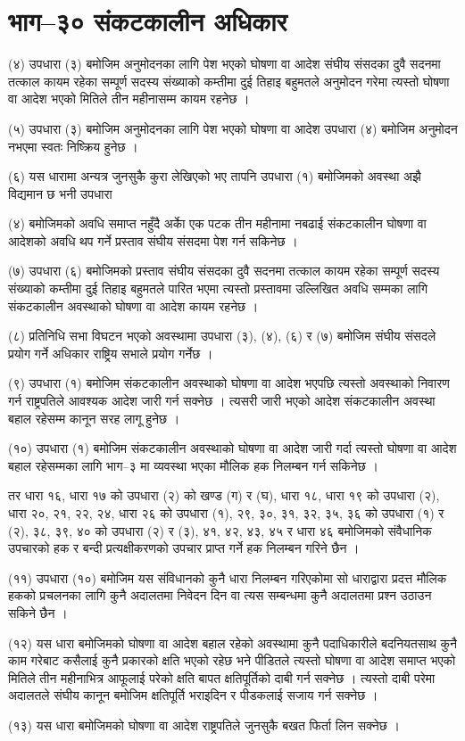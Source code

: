 \section{भाग–३० संकटकालीन अधिकार}

(४) उपधारा (३) बमोजिम अनुमोदनका लागि पेश भएको घोषणा वा आदेश संघीय संसदका दुवै सदनमा तत्काल कायम रहेका सम्पूर्ण सदस्य संख्याको कम्तीमा दुई तिहाइ बहुमतले अनुमोदन गरेमा त्यस्तो घोषणा वा आदेश भएको मितिले तीन महीनासम्म कायम रहनेछ ।

(५) उपधारा (३) बमोजिम अनुमोदनका लागि पेश भएको घोषणा वा आदेश उपधारा (४) बमोजिम अनुमोदन नभएमा स्वतः निष्क्रिय हुनेछ ।

(६) यस धारामा अन्यत्र जुनसुकै कुरा लेखिएको भए तापनि उपधारा (१) बमोजिमको अवस्था अझै विद्यमान छ भनी उपधारा

(४) बमोजिमको अवधि समाप्त नहुँदै अर्काे एक पटक तीन महीनामा नबढाई संकटकालीन घोषणा वा आदेशको अवधि थप गर्ने प्रस्ताव संघीय संसदमा पेश गर्न सकिनेछ ।

(७) उपधारा (६) बमोजिमको प्रस्ताव संघीय संसदका दुवै सदनमा तत्काल कायम रहेका सम्पूर्ण सदस्य संख्याको कम्तीमा दुई तिहाइ बहुमतले पारित भएमा त्यस्तो प्रस्तावमा उल्लिखित अवधि सम्मका लागि संकटकालीन अवस्थाको घोषणा वा आदेश कायम रहनेछ ।

(८) प्रतिनिधि सभा विघटन भएको अवस्थामा उपधारा (३), (४), (६) र (७) बमोजिम संघीय संसदले प्रयोग गर्ने अधिकार राष्ट्रिय सभाले प्रयोग गर्नेछ ।

(९) उपधारा (१) बमोजिम संकटकालीन अवस्थाको घोषणा वा आदेश भएपछि त्यस्तो अवस्थाको निवारण गर्न राष्ट्रपतिले आवश्यक आदेश जारी गर्न सक्नेछ । त्यसरी जारी भएको आदेश संकटकालीन अवस्था बहाल रहेसम्म कानून सरह लागू हुनेछ ।

(१०) उपधारा (१) बमोजिम संकटकालीन अवस्थाको घोषणा वा आदेश जारी गर्दा त्यस्तो घोषणा वा आदेश बहाल रहेसम्मका लागि भाग–३ मा व्यवस्था भएका मौलिक हक निलम्बन गर्न सकिनेछ ।

तर धारा १६, धारा १७ को उपधारा (२) को खण्ड (ग) र (घ), धारा १८, धारा १९ को उपधारा (२), धारा २०, २१, २२, २४, धारा २६ को उपधारा (१), २९, ३०, ३१, ३२, ३५, ३६ को उपधारा (१) र (२), ३८, ३९, ४० को उपधारा (२) र (३), ४१, ४२, ४३, ४५ र धारा ४६ बमोजिमको संवैधानिक उपचारको हक र बन्दी प्रत्यक्षीकरणको उपचार प्राप्त गर्ने हक निलम्बन गरिने छैन ।

(११) उपधारा (१०) बमोजिम यस संविधानको कुनै धारा निलम्बन गरिएकोमा सो धाराद्वारा प्रदत्त मौलिक हकको प्रचलनका लागि कुनै अदालतमा निवेदन दिन वा त्यस सम्बन्धमा कुनै अदालतमा प्रश्न उठाउन सकिने छैन ।

(१२) यस धारा बमोजिमको घोषणा वा आदेश बहाल रहेको अवस्थामा कुनै पदाधिकारीले बदनियतसाथ कुनै काम गरेबाट कसैलाई कुनै प्रकारको क्षति भएको रहेछ भने पीडितले त्यस्तो घोषणा वा आदेश समाप्त भएको मितिले तीन महीनाभित्र आफूलाई परेको क्षति बापत क्षतिपूर्तिको दाबी गर्न सक्नेछ । त्यस्तो दाबी परेमा अदालतले संघीय कानून बमोजिम क्षतिपूर्ति भराइदिन र पीडकलाई सजाय गर्न सक्नेछ ।

(१३) यस धारा बमोजिमको घोषणा वा आदेश राष्ट्रपतिले जुनसुकै बखत फिर्ता लिन सक्नेछ ।